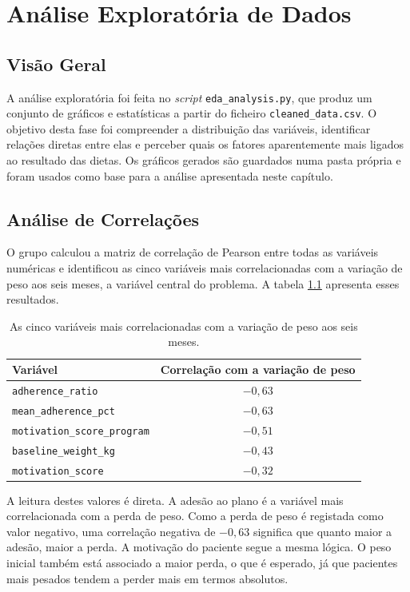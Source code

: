 \chapter{Análise Exploratória de Dados}
\label{chap:eda}

\section{Visão Geral}
A análise exploratória foi feita no \textit{script} \texttt{eda\_analysis.py}, que produz um conjunto de gráficos e estatísticas a partir do ficheiro \texttt{cleaned\_data.csv}. O objetivo desta fase foi compreender a distribuição das variáveis, identificar relações diretas entre elas e perceber quais os fatores aparentemente mais ligados ao resultado das dietas. Os gráficos gerados são guardados numa pasta própria e foram usados como base para a análise apresentada neste capítulo.

\section{Análise de Correlações}
O grupo calculou a matriz de correlação de Pearson entre todas as variáveis numéricas e identificou as cinco variáveis mais correlacionadas com a variação de peso aos seis meses, a variável central do problema. A tabela \ref{tab:corr} apresenta esses resultados.

\begin{table}[h]
\centering
\begin{tabular}{|l|c|}
\hline
\textbf{Variável} & \textbf{Correlação com a variação de peso} \\
\hline
\texttt{adherence\_ratio} & $-0,63$ \\
\texttt{mean\_adherence\_pct} & $-0,63$ \\
\texttt{motivation\_score\_program} & $-0,51$ \\
\texttt{baseline\_weight\_kg} & $-0,43$ \\
\texttt{motivation\_score} & $-0,32$ \\
\hline
\end{tabular}
\caption{As cinco variáveis mais correlacionadas com a variação de peso aos seis meses.}
\label{tab:corr}
\end{table}

A leitura destes valores é direta. A adesão ao plano é a variável mais correlacionada com a perda de peso. Como a perda de peso é registada como valor negativo, uma correlação negativa de $-0,63$ significa que quanto maior a adesão, maior a perda. A motivação do paciente segue a mesma lógica. O peso inicial também está associado a maior perda, o que é esperado, já que pacientes mais pesados tendem a perder mais em termos absolutos.

